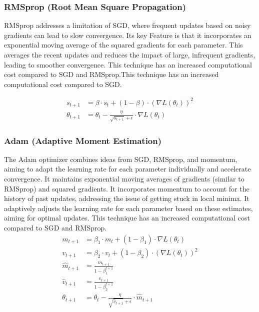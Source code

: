 \documentclass{article}
\begin{document}
\subsubsection{RMSprop (Root Mean Square Propagation)}
RMSprop addresses a limitation of SGD, where frequent updates based on noisy gradients can lead to slow convergence.
Its key Feature is that it incorporates an exponential moving average of the squared gradients for each parameter. This averages the recent updates and reduces the impact of large, infrequent gradients, leading to smoother convergence. This technique has an increased computational cost compared to SGD and RMSprop.This technique has an increased computational cost compared to SGD.

\begin{align*}
    s_{t+1}      & = \beta \cdot s_t + (1 - \beta) \cdot (\nabla L(\theta_t))^2                 \\
    \theta_{t+1} & = \theta_t - \frac{\eta}{\sqrt{s_{t+1}} + \epsilon} \cdot \nabla L(\theta_t)
\end{align*}

\subsubsection{Adam (Adaptive Moment Estimation)}
The Adam optimizer combines ideas from SGD, RMSprop, and momentum, aiming to adapt the learning rate for each parameter individually and accelerate convergence.
It maintains exponential moving averages of gradients (similar to RMSprop) and squared gradients.
It incorporates momentum to account for the history of past updates, addressing the issue of getting stuck in local minima.
It adaptively adjusts the learning rate for each parameter based on these estimates, aiming for optimal updates. This technique has an increased computational cost compared to SGD and RMSprop.
\begin{align*}
    m_{t+1}       & = \beta_1 \cdot m_t + (1 - \beta_1) \cdot \nabla L(\theta_t)                  \\
    v_{t+1}       & = \beta_2 \cdot v_t + (1 - \beta_2) \cdot (\nabla L(\theta_t))^2              \\
    \hat{m}_{t+1} & = \frac{m_{t+1}}{1 - \beta_1^{t+1}}                                           \\
    \hat{v}_{t+1} & = \frac{v_{t+1}}{1 - \beta_2^{t+1}}                                           \\
    \theta_{t+1}  & = \theta_t - \frac{\eta}{\sqrt{\hat{v}_{t+1}} + \epsilon} \cdot \hat{m}_{t+1}
\end{align*}
\end{document}
